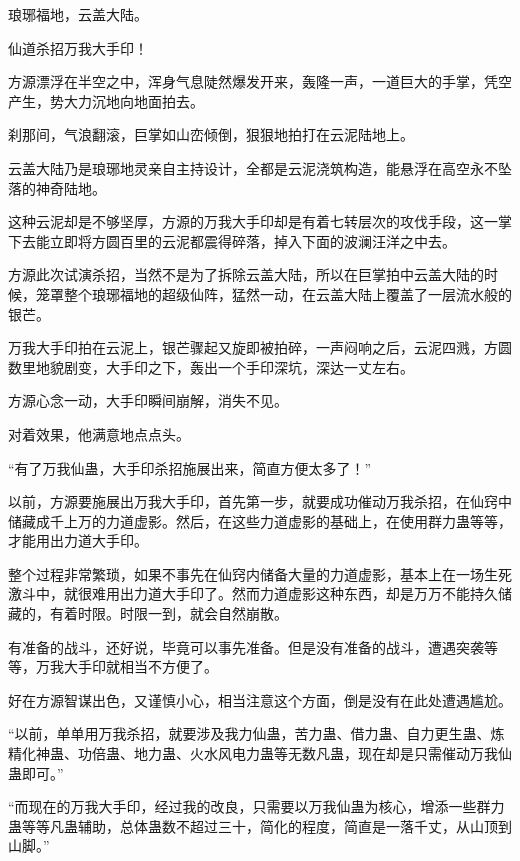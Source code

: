 
\begin{this_body}



琅琊福地，云盖大陆。

仙道杀招万我大手印！

方源漂浮在半空之中，浑身气息陡然爆发开来，轰隆一声，一道巨大的手掌，凭空产生，势大力沉地向地面拍去。

刹那间，气浪翻滚，巨掌如山峦倾倒，狠狠地拍打在云泥陆地上。

云盖大陆乃是琅琊地灵亲自主持设计，全都是云泥浇筑构造，能悬浮在高空永不坠落的神奇陆地。

这种云泥却是不够坚厚，方源的万我大手印却是有着七转层次的攻伐手段，这一掌下去能立即将方圆百里的云泥都震得碎落，掉入下面的波澜汪洋之中去。

方源此次试演杀招，当然不是为了拆除云盖大陆，所以在巨掌拍中云盖大陆的时候，笼罩整个琅琊福地的超级仙阵，猛然一动，在云盖大陆上覆盖了一层流水般的银芒。

万我大手印拍在云泥上，银芒骤起又旋即被拍碎，一声闷响之后，云泥四溅，方圆数里地貌剧变，大手印之下，轰出一个手印深坑，深达一丈左右。

方源心念一动，大手印瞬间崩解，消失不见。

对着效果，他满意地点点头。

“有了万我仙蛊，大手印杀招施展出来，简直方便太多了！”

以前，方源要施展出万我大手印，首先第一步，就要成功催动万我杀招，在仙窍中储藏成千上万的力道虚影。然后，在这些力道虚影的基础上，在使用群力蛊等等，才能用出力道大手印。

整个过程非常繁琐，如果不事先在仙窍内储备大量的力道虚影，基本上在一场生死激斗中，就很难用出力道大手印了。然而力道虚影这种东西，却是万万不能持久储藏的，有着时限。时限一到，就会自然崩散。

有准备的战斗，还好说，毕竟可以事先准备。但是没有准备的战斗，遭遇突袭等等，万我大手印就相当不方便了。

好在方源智谋出色，又谨慎小心，相当注意这个方面，倒是没有在此处遭遇尴尬。

“以前，单单用万我杀招，就要涉及我力仙蛊，苦力蛊、借力蛊、自力更生蛊、炼精化神蛊、功倍蛊、地力蛊、火水风电力蛊等无数凡蛊，现在却是只需催动万我仙蛊即可。”

“而现在的万我大手印，经过我的改良，只需要以万我仙蛊为核心，增添一些群力蛊等等凡蛊辅助，总体蛊数不超过三十，简化的程度，简直是一落千丈，从山顶到山脚。”


\end{this_body}
